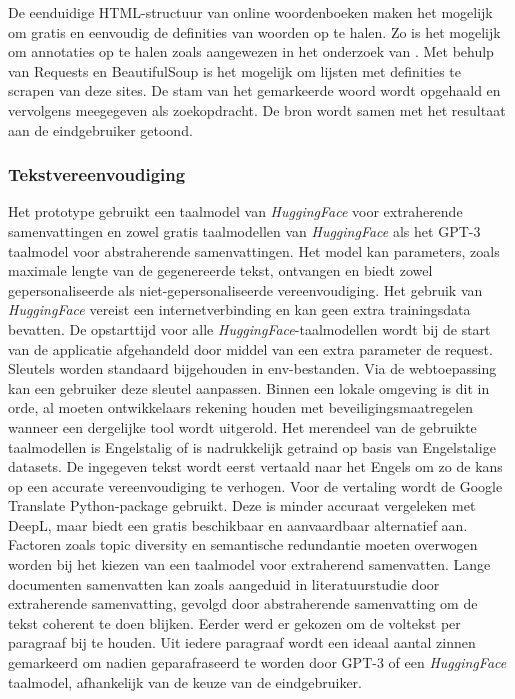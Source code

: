 \medspace

De eenduidige HTML-structuur van online woordenboeken maken het mogelijk om gratis en eenvoudig de definities van woorden op te halen. Zo is het mogelijk om annotaties op te halen zoals aangewezen in het onderzoek van \textcite{Bulte2018}. Met behulp van Requests en BeautifulSoup is het mogelijk om lijsten met definities te scrapen van deze sites. De stam van het gemarkeerde woord wordt opgehaald en vervolgens meegegeven als zoekopdracht. De bron wordt samen met het resultaat aan de eindgebruiker getoond. 

\subsubsection{Tekstvereenvoudiging}

Het prototype gebruikt een taalmodel van \textit{HuggingFace} voor extraherende samenvattingen en zowel gratis taalmodellen van \textit{HuggingFace} als het GPT-3 taalmodel voor abstraherende samenvattingen. Het model kan parameters, zoals maximale lengte van de gegenereerde tekst, ontvangen en biedt zowel gepersonaliseerde als niet-gepersonaliseerde vereenvoudiging. Het gebruik van \textit{HuggingFace} vereist een internetverbinding en kan geen extra trainingsdata bevatten. De opstarttijd voor alle \textit{HuggingFace}-taalmodellen wordt bij de start van de applicatie afgehandeld door middel van een extra parameter de request. Sleutels worden standaard bijgehouden in env-bestanden. Via de webtoepassing kan een gebruiker deze sleutel aanpassen. Binnen een lokale omgeving is dit in orde, al moeten ontwikkelaars rekening houden met beveiligingsmaatregelen wanneer een dergelijke tool wordt uitgerold. Het merendeel van de gebruikte taalmodellen is Engelstalig of is nadrukkelijk getraind op basis van Engelstalige datasets. De ingegeven tekst wordt eerst vertaald naar het Engels om zo de kans op een accurate vereenvoudiging te verhogen. Voor de vertaling wordt de Google Translate Python-package gebruikt. Deze is minder accuraat vergeleken met DeepL, maar biedt een gratis beschikbaar en aanvaardbaar alternatief aan. Factoren zoals topic diversity en semantische redundantie moeten overwogen worden bij het kiezen van een taalmodel voor extraherend samenvatten. Lange documenten samenvatten kan zoals aangeduid in literatuurstudie door extraherende samenvatting, gevolgd door abstraherende samenvatting om de tekst coherent te doen blijken. Eerder werd er gekozen om de voltekst per paragraaf bij te houden. Uit iedere paragraaf wordt een ideaal aantal zinnen gemarkeerd om nadien geparafraseerd te worden door GPT-3 of een \textit{HuggingFace} taalmodel, afhankelijk van de keuze van de eindgebruiker.


